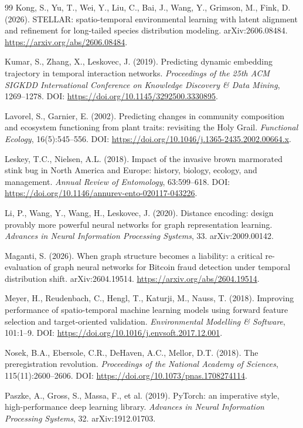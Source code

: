 \documentclass[a4paper,fleqn]{cas-sc}
\begin{document}
\begin{thebibliography}{99}
 Kong, S., Yu, T., Wei, Y., Liu, C., Bai, J., Wang, Y., Grimson, M., Fink, D. (2026). STELLAR: spatio-temporal environmental learning with latent alignment and refinement for long-tailed species distribution modeling. arXiv:2606.08484. \url{https://arxiv.org/abs/2606.08484}.

 Kumar, S., Zhang, X., Leskovec, J. (2019). Predicting dynamic embedding trajectory in temporal interaction networks. \textit{Proceedings of the 25th ACM SIGKDD International Conference on Knowledge Discovery \& Data Mining}, 1269--1278. DOI: \url{https://doi.org/10.1145/3292500.3330895}.

 Lavorel, S., Garnier, E. (2002). Predicting changes in community composition and ecosystem functioning from plant traits: revisiting the Holy Grail. \textit{Functional Ecology}, 16(5):545--556. DOI: \url{https://doi.org/10.1046/j.1365-2435.2002.00664.x}.

 Leskey, T.C., Nielsen, A.L. (2018). Impact of the invasive brown marmorated stink bug in North America and Europe: history, biology, ecology, and management. \textit{Annual Review of Entomology}, 63:599--618. DOI: \url{https://doi.org/10.1146/annurev-ento-020117-043226}.

 Li, P., Wang, Y., Wang, H., Leskovec, J. (2020). Distance encoding: design provably more powerful neural networks for graph representation learning. \textit{Advances in Neural Information Processing Systems}, 33. arXiv:2009.00142.

 Maganti, S. (2026). When graph structure becomes a liability: a critical re-evaluation of graph neural networks for Bitcoin fraud detection under temporal distribution shift. arXiv:2604.19514. \url{https://arxiv.org/abs/2604.19514}.

 Meyer, H., Reudenbach, C., Hengl, T., Katurji, M., Nauss, T. (2018). Improving performance of spatio-temporal machine learning models using forward feature selection and target-oriented validation. \textit{Environmental Modelling \& Software}, 101:1--9. DOI: \url{https://doi.org/10.1016/j.envsoft.2017.12.001}.

 Nosek, B.A., Ebersole, C.R., DeHaven, A.C., Mellor, D.T. (2018). The preregistration revolution. \textit{Proceedings of the National Academy of Sciences}, 115(11):2600--2606. DOI: \url{https://doi.org/10.1073/pnas.1708274114}.

 Paszke, A., Gross, S., Massa, F., et al. (2019). PyTorch: an imperative style, high-performance deep learning library. \textit{Advances in Neural Information Processing Systems}, 32. arXiv:1912.01703.


\end{thebibliography}
\end{document}
